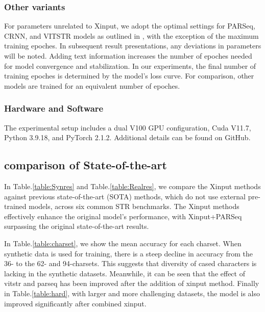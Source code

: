 \documentclass[runningheads]{llncs}
\begin{document}
\subsubsection{Other variants} 
For parameters unrelated to Xinput, we adopt the optimal settings for PARSeq, CRNN, and VITSTR models as outlined in \cite{bautista2022parseq}, with the exception of the maximum training epoches.	In subsequent result presentations, any deviations in parameters will be noted.	Adding text information increases the number of epoches needed for model convergence and stabilization.	In our experiments, the final number of training epoches is determined by the model's loss curve.	For comparison, other models are trained for an equivalent number of epoches.	

\subsubsection{Hardware and Software}
The experimental setup includes a dual V100 GPU configuration, Cuda V11.7, Python 3.9.18, and PyTorch 2.1.2. Additional details can be found on GitHub.	

\subsection{comparison of State-of-the-art}
In Table.\ref{table:Synres} and Table.\ref{table:Realres}, we compare the Xinput methods against previous state-of-the-art (SOTA) methods, which do not use external pre-trained models, across six common STR benchmarks.	The Xinput methods effectively enhance the original model's performance, with Xinput+PARSeq surpassing the original state-of-the-art results.

In Table.\ref*{table:charset}, we show the mean accuracy for each charset. When synthetic data is used for training, there is a steep decline in accuracy from the 36- to the 62- and 94-charsets. This suggests that diversity of cased characters is lacking in the synthetic datasets. Meanwhile, it can be seen that the effect of vitstr and parseq has been improved after the addition of xinput method. Finally in Table.\ref*{table:hard}, with larger and more challenging datasets, the model is also improved significantly after combined xinput.
\end{document}
